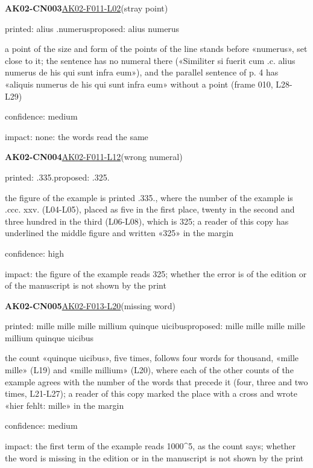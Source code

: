 \documentclass[11pt]{article}
\begin{document}
\noindent\textbf{AK02-CN003}\enspace\hyperlink{AK02-F011-L02}{AK02-F011-L02}\enspace(stray point)\par\noindent printed: alius .numerus\enspace proposed: alius numerus\par\noindent a point of the size and form of the points of the line stands before «numerus», set close to it; the sentence has no numeral there («Similiter si fuerit cum .c. alius numerus de his qui sunt infra eum»), and the parallel sentence of p. 4 has «aliquis numerus de his qui sunt infra eum» without a point (frame 010, L28-L29)\par\noindent confidence: medium\par\noindent impact: none: the words read the same\par\medskip
\noindent\textbf{AK02-CN004}\enspace\hyperlink{AK02-F011-L12}{AK02-F011-L12}\enspace(wrong numeral)\par\noindent printed: .335.\enspace proposed: .325.\par\noindent the figure of the example is printed .335., where the number of the example is .ccc. xxv. (L04-L05), placed as five in the first place, twenty in the second and three hundred in the third (L06-L08), which is 325; a reader of this copy has underlined the middle figure and written «325» in the margin\par\noindent confidence: high\par\noindent impact: the figure of the example reads 325; whether the error is of the edition or of the manuscript is not shown by the print\par\medskip
\noindent\textbf{AK02-CN005}\enspace\hyperlink{AK02-F013-L20}{AK02-F013-L20}\enspace(missing word)\par\noindent printed: mille mille mille millium quinque uicibus\enspace proposed: mille mille mille mille millium quinque uicibus\par\noindent the count «quinque uicibus», five times, follows four words for thousand, «mille mille» (L19) and «mille millium» (L20), where each of the other counts of the example agrees with the number of the words that precede it (four, three and two times, L21-L27); a reader of this copy marked the place with a cross and wrote «hier fehlt: mille» in the margin\par\noindent confidence: medium\par\noindent impact: the first term of the example reads 1000\^{}5, as the count says; whether the word is missing in the edition or in the manuscript is not shown by the print\par\medskip
\end{document}
